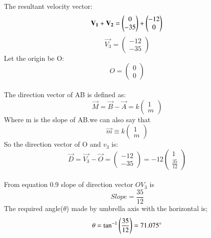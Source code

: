 \documentclass[journal]{IEEEtran}
\begin{document}
The resultant velocity vector:\\
\begin{equation}
\vec{V_{1}}+\vec{V_{2}}=\begin{pmatrix}
    0\\
    -35
\end{pmatrix}
+
\begin{pmatrix}
    -12\\
    0
\end{pmatrix}\\
\end{equation}
\begin{equation}
    \vec{V_{3}}=\begin{pmatrix}
        -12\\
        -35
    \end{pmatrix}
\end{equation}
Let the origin be O:
\begin{equation}
    O=\begin{pmatrix}
        0\\
        0
    \end{pmatrix}
\end{equation}\\


The direction vector of AB is defined as:
\begin{equation}
    \vec{M}=\vec{B}-\vec{A}=k\begin{pmatrix}
        1\\
        m
    \end{pmatrix}
    \tag{1.1.1.1}
\end{equation}
Where m is the slope of AB.we can also say that\\

\begin{equation}
    \vec{m}\equiv k\begin{pmatrix}
        1\\
        m
    \end{pmatrix}
    \tag{1.1.1.2}
\end{equation}
So the direction vector of O and $v_{3}$ is:
\begin{equation}
    \vec{D}=\vec{V_{3}}-\vec{O}=\begin{pmatrix}
        -12\\
        -35
    \end{pmatrix}
=-12\begin{pmatrix}
    1\\
    \frac{35}{12}
\end{pmatrix}
\end{equation}\\
From equation 0.9 slope of direction vector $OV_{3}$ is\\
\begin{equation}
    Slope=\frac{35}{12}
\end{equation}
The required angle($\theta$) made by umbrella axis with the horizontal is;\\
\begin{equation}
    \theta=\tan^{-1}\brak{\frac{35}{12}}=71.075^\circ
\end{equation}\\
\end{document}
